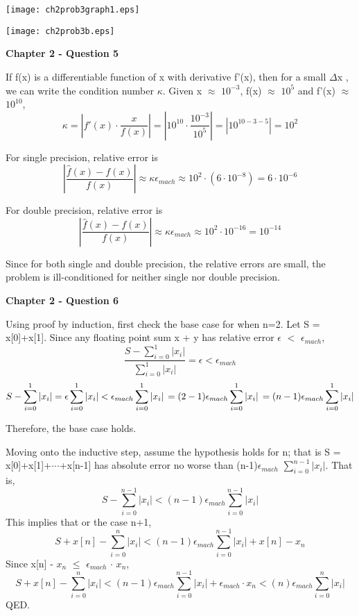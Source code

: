 \documentclass{article}
\begin{document}
\begin{center}
\texttt{[image: ch2prob3graph1.eps]}

\texttt{[image: ch2prob3b.eps]}
\end{center}

\textbf{Chapter 2 - Question 5}

If f(x) is a differentiable function of x with derivative f'(x), then for a small  $\Delta$x , we can write the condition number $\kappa$. Given x $\approx$ $10^{-3}$, f(x) $\approx$ $10^{5}$ and f'(x) $\approx$ $10^{10}$, 
\[
\kappa = \left |  f'(x)\cdot \frac{x}{f(x)}  \right | = \left |  10^{10}\cdot \frac{10^{-3}}{10^{5}}  \right | = \left |  10^{10-3-5}  \right | = 10^{2} 
\]

For single precision, relative error is 
\[
\left | \frac{\hat{f}(x)-f(x)}{f(x)}  \right | \approx \kappa\epsilon_{mach}  \approx 10^{2} \cdot (6\cdot10^{-8}) = 6\cdot 10^{-6}
\]

For double precision, relative error is 
\[
\left | \frac{\hat{f}(x)-f(x)}{f(x)}  \right | \approx \kappa\epsilon_{mach}  \approx 10^{2} \cdot 10^{-16} =  10^{-14}
\]

Since for both single and double precision, the relative errors are small, the problem is ill-conditioned for neither single nor double precision. 

\newpage
\textbf{Chapter 2 - Question 6}

Using proof by induction, first check the base case for when n=2. Let S = x[0]+x[1]. Since any floating point sum x + y has relative error $\epsilon$ $<$ $\epsilon_{mach}$, 
\[
\frac{S-\sum\limits_{i=0}^1 \left | x_{i} \right |}{\sum\limits_{i=0}^1 \left | x_{i} \right |} = \epsilon < \epsilon_{mach}
\]
\[
S -\sum\limits_{i=0}^1 \left | x_{i} \right | = \epsilon \sum\limits_{i=0}^1 \left | x_{i} \right | < \epsilon_{mach}
 \sum\limits_{i=0}^1 \left | x_{i} \right | \\ = (2-1) \epsilon_{mach}
 \sum\limits_{i=0}^1 \left | x_{i} \right | \\ = (n-1) \epsilon_{mach}
 \sum\limits_{i=0}^1 \left | x_{i} \right |
\]

Therefore, the base case holds. 

Moving onto the inductive step, assume the hypothesis holds for n; that is S = x[0]+x[1]+$\cdot$$\cdot$$\cdot$+x[n-1] has absolute error no worse than (n-1)$\epsilon_{mach}$ $\sum\limits_{i=0}^{n-1} \left | x_{i} \right |$. That is,
\[
S - \sum\limits_{i=0}^{n-1} \left | x_{i} \right | < (n-1) \epsilon_{mach} \sum\limits_{i=0}^{n-1} \left | x_{i} \right |
\]
This implies that or the case n+1, 
\[
S + x[n] - \sum\limits_{i=0}^{n} \left | x_{i} \right | < (n-1) \epsilon_{mach} \sum\limits_{i=0}^{n-1} \left | x_{i} \right | + x[n] - x_{n}
\]
Since  x[n] - $x_{n}$ $\le$ $\epsilon_{mach}$ $\cdot$ $x_{n}$,
\[
S + x[n] - \sum\limits_{i=0}^{n} \left | x_{i} \right | < (n-1) \epsilon_{mach} \sum\limits_{i=0}^{n-1} \left | x_{i} \right | + \epsilon_{mach} \cdot x_{n} <  (n) \epsilon_{mach} \sum\limits_{i=0}^{n} \left | x_{i} \right |
\]
QED.
\end{document}
